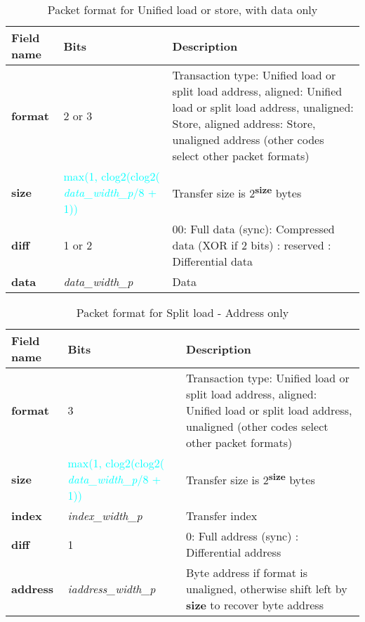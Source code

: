 \begin{table}[htp]
  \centering
  \caption{Packet format for Unified load or store, with data only}
  \label{tab:te_datadx0y2}
  \begin{tabulary}{\textwidth}{|l|p{38mm}|p{92mm}|}
    \hline
    {\bf Field name} & {\bf Bits} & {\bf Description} \\
    \hline
    \textbf{format} & 	2 or 3	& Transaction type: Unified load or split load address, aligned: Unified load or split load address, unaligned: Store, aligned address: Store, unaligned address\newline
		(other codes select other packet formats)\\
    \hline
    \textbf{size} & \textcolor{cyan}{max(1, clog2(clog2( \textit{data\_width\_p}/8 + 1))} & Transfer size is 2\textsuperscript{\textbf{size}} bytes \\
    \hline
    \textbf{diff} & 1 or 2 & 00: Full data (sync): Compressed data (XOR if 2 bits) : reserved : Differential data\\
    \hline
    \textbf{data} & \textit{data\_width\_p} & 
                Data\\
    \hline
  \end{tabulary}
\end{table}


\begin{table}[htp]
  \centering
  \caption{Packet format for Split load - Address only}
  \label{tab:te_datadx0y3}
  \begin{tabulary}{\textwidth}{|l|p{38mm}|p{92mm}|}
    \hline
    {\bf Field name} & {\bf Bits} & {\bf Description} \\
    \hline
    \textbf{format} & 	3	& Transaction type: Unified load or split load address, aligned: Unified load or split load address, unaligned\newline
		(other codes select other packet formats)\\
    \hline
    \textbf{size} & \textcolor{cyan}{max(1, clog2(clog2( \textit{data\_width\_p}/8 + 1))} & Transfer size is 2\textsuperscript{\textbf{size}} bytes \\
    \hline
    \textbf{index} & \textit{index\_width\_p} & Transfer index\\
    \hline
    \textbf{diff} & 1 & 0: Full address (sync)	: Differential address\\
    \hline
    \textbf{address} &  \textit{iaddress\_width\_p} & Byte address if format is unaligned, otherwise shift left by \textbf{size} to recover byte address \\
    \hline
  \end{tabulary}
\end{table}

